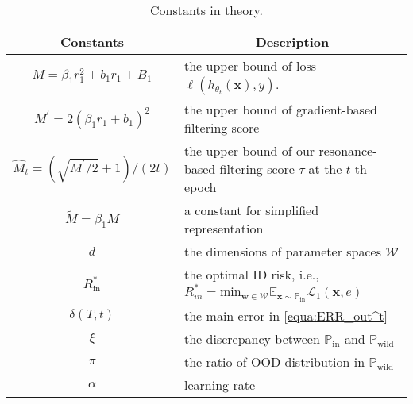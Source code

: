 \begin{table}[h!]
    \centering
    \begin{tabular}{c p{10cm}}
        \hline
        \textbf{Constants} & \multicolumn{1}{c}{\textbf{Description}} \\
        \hline
        $M = \beta_1 r_1^2 + b_1r_1 + B_1$ & the upper bound of loss $\ell(h_{\theta_t}(\mathbf{x}),y)$.\\
        $M^{\prime} = 2(\beta_1 r_1 + b_1)^2$ & the upper bound of gradient-based filtering score \citep{du2024does} \\
        $\widehat{M}_t =  (\sqrt{M^{\prime}/2}+1)/(2t)$ & the upper bound of our resonance-based filtering score $\tau$ at the $t$-th epoch \\
        $\tilde{M} = \beta_1M$& a constant for simplified representation\\
        $d$ & the dimensions of parameter spaces $\mathcal{W}$\\
        $R_{\text{in}}^{*}$ & the optimal ID risk, i.e., $R_{in}^{*} = \mathrm{min}_{\mathbf{w}\in \mathcal{W}}\mathbb{E_{\mathbf{x}\sim\mathbb{P}_{\mathrm{in}}}}\mathcal{L}_1(\mathbf{x}, e)$\\
        $\delta(T, t)$ & the main error in \ref{equa:ERR_out^t}\\
        $\xi$ & the discrepancy between $\mathbb{P}_{\text{in}}$ and $\mathbb{P}_{\text{wild}}$\\
        $\pi$ & the ratio of OOD distribution in $\mathbb{P}_{\text{wild}}$\\
        $\alpha$ & learning rate\\
        \hline
    \end{tabular}
    \caption{Constants in theory.}
    \label{tab:constants}
\end{table}

